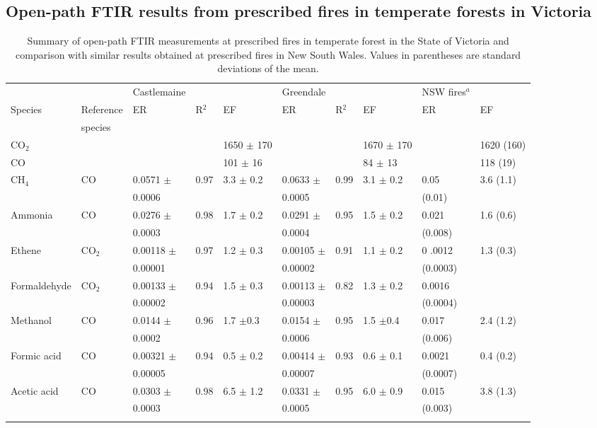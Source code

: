 \documentclass[acp, manuscript]{copernicus}
\providecommand{\DIFadd}[1]{{\protect\color{blue}\uwave{#1}}} %
\providecommand{\DIFaddFL}[1]{\DIFadd{#1}} %
\providecommand{\DIFaddbeginFL}{} %
\providecommand{\DIFaddendFL}{} %
\begin{document}
\subsection{Open-path FTIR results from prescribed fires in temperate forests in Victoria }

\begin{table} 
  \caption{Summary of open-path FTIR measurements at prescribed fires in temperate forest in the State of Victoria and comparison with similar results obtained at prescribed fires in New South Wales. Values in parentheses are standard deviations of the mean.}
 \begin{tabular}{l l l l l l l l l l  } 
   \tophline
   & & Castlemaine & & & Greendale & & & NSW fires$^a$ & \\
   Species & Reference &ER & R$^2$ & EF & ER & R$^2$ & EF &  ER & EF \\
   &species&&&&&&&&\\
   \hline
   CO$_2$ & & & & 1650 $\pm$ 170 & & & 1670 $\pm$ 170 & & 1620 (160) \\
   CO & & & & 101 $\pm$ 16 & & &84 $\pm$ 13 & & 118 (19) \\
   CH$_4$ & CO & 0.0571  $\pm$   & 0.97 & 3.3 $\pm$ 0.2 & 0.0633 $\pm$ & 0.99 & 3.1 $\pm$ 0.2 &  0.05  & 3.6 (1.1) \\
   & &0.0006& & & 0.0005 &  &&(0.01)&\\
   Ammonia & CO & 0.0276 $\pm$ & 0.98 & 1.7 $\pm$ 0.2 & 0.0291 $\pm$& 0.95 & 1.5 $\pm$ 0.2 & 0.021  & 1.6 (0.6)\\
    & &  0.0003& & & 0.0004 &  &&(0.008)&\\
   Ethene & CO$_2$ & 0.00118 $\pm$ & 0.97 & 1.2 $\pm$ 0.3 & 0.00105 $\pm$ & 0.91 & 1.1 $\pm$ 0.2 & 0
   .0012& 1.3 (0.3) \\
   & &  0.00001& & & 0.00002 &  &&(0.0003)&\\
   Formaldehyde & CO$_2$ & 0.00133 $\pm$ & 0.94 & 1.5 $\pm$ 0.3 & 0.00113 $\pm$& 0.82 & 1.3 $\pm$ 0.2 & 0.0016 & \DIFaddbeginFL \DIFaddFL{1.7 (0.4) }\DIFaddendFL \\
   & &  0.00002& & & 0.00003 &  &&(0.0004)&\\
   Methanol & CO & 0.0144 $\pm$& 0.96 & 1.7 $\pm$0.3 & 0.0154 $\pm$& 0.95 & 1.5 $\pm$0.4 & 0.017 & 2.4 (1.2) \\
   & &  0.0002& & & 0.0006 &  &&(0.006)&\\
   Formic acid & CO & 0.00321 $\pm$& 0.94 & 0.5 $\pm$ 0.2 & 0.00414 $\pm$& 0.93 & 0.6 $\pm$ 0.1 & 0.0021 & 0.4 (0.2)\\
    & &  0.00005& & & 0.00007 &  &&(0.0007)&\\
   Acetic acid & CO & 0.0303 $\pm$ & 0.98 & 6.5 $\pm$ 1.2 & 0.0331 $\pm$& 0.95 & 6.0 $\pm$ 0.9 & 0.015 & 3.8 (1.3)\\
     & &  0.0003& & & 0.0005 &  &&(0.003)&\\
 \bottomhline
\end{tabular}
\label{table:OP}
\end{table}
\end{document}
